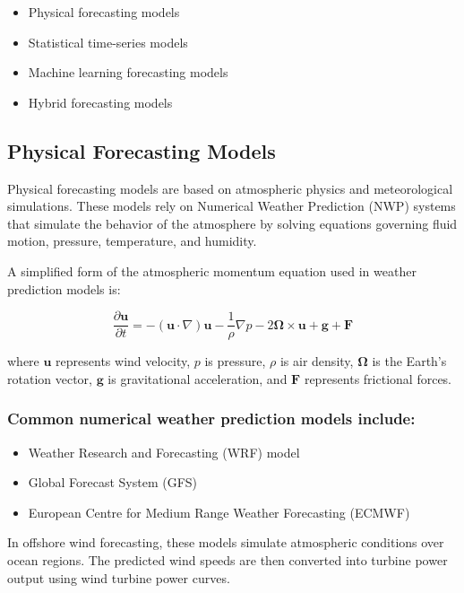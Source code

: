 \documentclass[12pt,a4paper]{article}
\begin{document}
\begin{itemize}
\item Physical forecasting models
\item Statistical time-series models
\item Machine learning forecasting models
\item Hybrid forecasting models
\end{itemize}

\subsection{Physical Forecasting Models}

Physical forecasting models are based on atmospheric physics and meteorological simulations. These models rely on Numerical Weather Prediction (NWP) systems that simulate the behavior of the atmosphere by solving equations governing fluid motion, pressure, temperature, and humidity.

A simplified form of the atmospheric momentum equation used in weather prediction models is:

\begin{equation}
\frac{\partial \mathbf{u}}{\partial t} = -(\mathbf{u}\cdot\nabla)\mathbf{u} - \frac{1}{\rho}\nabla p - 2\boldsymbol{\Omega} \times \mathbf{u} + \mathbf{g} + \mathbf{F}
\label{eq:navier_stokes}
\end{equation}

where $\mathbf{u}$ represents wind velocity, $p$ is pressure, $\rho$ is air density, $\boldsymbol{\Omega}$ is the Earth's rotation vector, $\mathbf{g}$ is gravitational acceleration, and $\mathbf{F}$ represents frictional forces.

\subsubsection*{Common numerical weather prediction models include:}

\begin{itemize}
\item Weather Research and Forecasting (WRF) model
\item Global Forecast System (GFS)
\item European Centre for Medium Range Weather Forecasting (ECMWF)
\end{itemize}

In offshore wind forecasting, these models simulate atmospheric conditions over ocean regions. The predicted wind speeds are then converted into turbine power output using wind turbine power curves.
\end{document}
